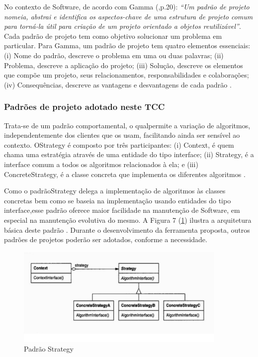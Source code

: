 No contexto de Software, de acordo com Gamma (\citeyear{gamma2000},p.20): \textit{“Um padrão de projeto nomeia, abstrai e identifica os aspectos-chave de uma estrutura de projeto comum para torná-la útil para criação de um projeto orientado a objetos reutilizável”}. Cada padrão de projeto tem como objetivo solucionar um problema em particular. Para Gamma, um padrão de projeto tem quatro elementos essenciais: (i) Nome do padrão, descreve o problema em uma ou duas palavras; (ii) Problema, descreve a aplicação do projeto; (iii) Solução, descreve os elementos que compõe um projeto, seus relacionamentos, responsabilidades e colaborações; (iv) Consequências, descreve as vantagens e desvantagens de cada padrão \cite[p.19]{gamma2000}.

\subsubsection{Padrões de projeto adotado neste TCC}


Trata-se de um padrão comportamental, o qualpermite a variação de algoritmos, independentemente dos clientes que os usam, facilitando ainda ser sensível ao contexto. OStrategy é composto por três participantes: (i) Context, é quem chama uma estratégia através de uma entidade do tipo interface; (ii) Strategy, é a interface comum a todos os algoritmos relacionados à ela; e (iii) ConcreteStrategy, é a classe concreta que implementa os diferentes algoritmos \cite[p.294]{gamma2000}. 

Como o padrãoStrategy delega a implementação de algoritmos às classes concretas bem como se baseia na implementação usando entidades do tipo interface,esse padrão oferece maior facilidade na manutenção de Software, em especial na manutenção evolutiva do mesmo. A Figura 7 (\ref{f07}) ilustra a arquitetura básica deste padrão \cite[p.295]{gamma2000}. Durante o desenvolvimento da ferramenta proposta, outros padrões de projetos poderão ser adotados, conforme a necessidade.

\begin{figure}[h]
\centering
\label{f07}
\includegraphics[width=0.9\textwidth]{figuras/f07}
\caption{Padrão Strategy}

\end{figure}

